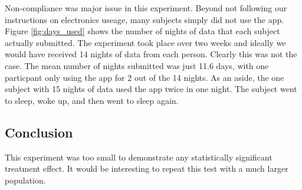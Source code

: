 \documentclass[]{article}
\begin{document}
Non-compliance was major issue in this experiment. Beyond not following
our instructions on electronics useage, many subjects simply did not use
the app. Figure \ref{fig:days_used} shows the number of nights of data
that each subject actually submitted. The experiment took place over two
weeks and ideally we would have received 14 nights of data from each
person. Clearly this was not the case. The mean number of nights
submitted was just 11.6 days, with one particpant only using the app for
2 out of the 14 nights. As an aside, the one subject with 15 nights of
data used the app twice in one night. The subject went to sleep, woke
up, and then went to sleep again.

\hypertarget{conclusion}{%
\subsection{Conclusion}\label{conclusion}}

This experiment was too small to demonstrate any statistically
significant treatment effect. It would be interesting to repeat this
test with a much larger population.
\end{document}

